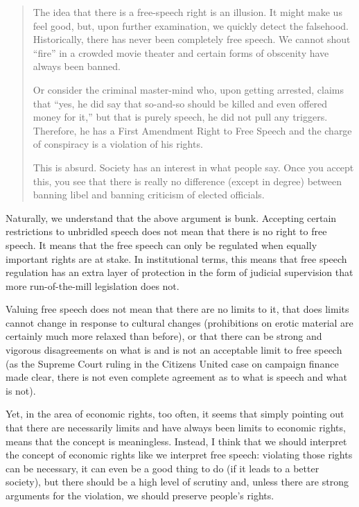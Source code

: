 \begin{quote}
The idea that there is a free-speech right is an illusion. It might make us
feel good, but, upon further examination, we quickly detect the falsehood.
Historically, there has never been completely free speech. We cannot shout
``fire'' in a crowded movie theater and certain forms of obscenity have always
been banned.

Or consider the criminal master-mind who, upon getting arrested, claims that
``yes, he did say that so-and-so should be killed and even offered money for
it,'' but that is purely speech, he did not pull any triggers. Therefore, he
has a First Amendment Right to Free Speech and the charge of conspiracy is a
violation of his rights.

This is absurd. Society has an interest in what people say. Once you accept
this, you see that there is really no difference (except in degree) between
banning libel and banning criticism of elected officials.
\end{quote}

Naturally, we understand that the above argument is bunk. Accepting certain
restrictions to unbridled speech does not mean that there is no right to free
speech. It means that the free speech can only be regulated when equally
important rights are at stake. In institutional terms, this means that free
speech regulation has an extra layer of protection in the form of judicial
supervision that more run-of-the-mill legislation does not.

Valuing free speech does not mean that there are no limits to it, that does
limits cannot change in response to cultural changes (prohibitions on erotic
material are certainly much more relaxed than before), or that there can be
strong and vigorous disagreements on what is and is not an acceptable limit to
free speech (as the Supreme Court ruling in the Citizens United case on
campaign finance made clear, there is not even complete agreement as to what is
speech and what is not).

Yet, in the area of economic rights, too often, it seems that simply pointing
out that there are necessarily limits and have always been limits to economic
rights, means that the concept is meaningless. Instead, I think that we should
interpret the concept of economic rights like we interpret free speech:
violating those rights can be necessary, it can even be a good thing to do (if
it leads to a better society), but there should be a high level of scrutiny
and, unless there are strong arguments for the violation, we should preserve
people's rights.

